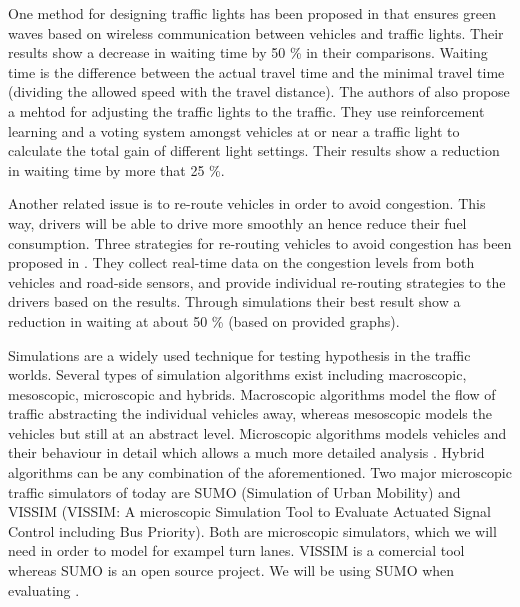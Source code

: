 One method for designing traffic lights has been proposed in \cite{SOTL} that ensures green waves based on wireless communication between vehicles and traffic lights. 
Their results show a decrease in waiting time by 50 \% in their comparisons. 
Waiting time is the difference between the actual travel time and the minimal travel time (dividing the allowed speed with the travel distance).
The authors of \cite{ITLC} also propose a mehtod for adjusting the traffic lights to the traffic. 
They use reinforcement learning and a voting system amongst vehicles at or near a traffic light to calculate the total gain of different light settings. 
Their results show a reduction in waiting time by more that 25 \%.

Another related issue is to re-route vehicles in order to avoid congestion. 
This way, drivers will be able to drive more smoothly an hence reduce their fuel consumption. 
Three strategies for re-routing vehicles to avoid congestion has been proposed in \cite{congestionAvoidance}. 
They collect real-time data on the congestion levels from both vehicles and road-side sensors, and provide individual re-routing strategies to the drivers based on the results. 
Through simulations their best result show a reduction in waiting at about 50 \% (based on provided graphs). %

Simulations are a widely used technique for testing hypothesis in the traffic worlds.
Several types of simulation algorithms exist including macroscopic, mesoscopic, microscopic and hybrids.
Macroscopic algorithms model the flow of traffic abstracting the individual vehicles away, whereas mesoscopic models the vehicles but still at an abstract level. 
Microscopic algorithms models vehicles and their behaviour in detail which allows a much more detailed analysis \cite{meso-micro}. 
Hybrid algorithms can be any combination of the aforementioned.
Two major microscopic traffic simulators of today are SUMO (Simulation of Urban Mobility)\cite{sumo} and VISSIM (VISSIM: A microscopic Simulation Tool to Evaluate Actuated Signal Control including Bus Priority)\cite{vissim}.
Both are microscopic simulators, which we will need in order to model for exampel turn lanes.
VISSIM is a comercial tool whereas SUMO is an open source project.
We will be using SUMO when evaluating \tech.








